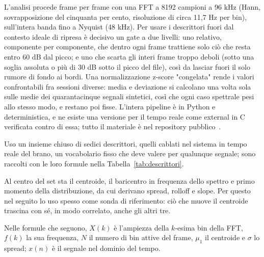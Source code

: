 \documentclass{article}
\begin{document}
L'analisi procede frame per frame con una FFT a 8192 campioni a 96 kHz (Hann, sovrapposizione del cinquanta per cento, risoluzione di circa 11,7 Hz per bin), sull'intera banda fino a Nyquist (48 kHz).%
 Per usare i descrittori fuori dal contesto ideale di ripresa è decisivo un gate a due livelli: uno relativo, componente per componente, che dentro ogni frame trattiene solo ciò che resta entro 60 dB dal picco; e uno che scarta gli interi frame troppo deboli (sotto una soglia assoluta o più di 30 dB sotto il picco del file), così da lasciar fuori il solo rumore di fondo ai bordi. Una normalizzazione z-score "congelata" rende i valori confrontabili fra sessioni diverse: media e deviazione si calcolano una volta sola sulle medie dei quarantacinque segnali sintetici, così che ogni caso spettrale pesi allo stesso modo, e restano poi fisse. L'intera pipeline è in Python e deterministica, e ne esiste una versione per il tempo reale come external in C verificata contro di essa; tutto il materiale è nel repository pubblico~\cite{reposupp}.

Uso un insieme chiuso di sedici descrittori, quelli cablati nel sistema in tempo reale del brano, un vocabolario fisso che deve valere per qualunque segnale; sono raccolti con le loro formule nella Tabella~\ref{tab:descrittori}.

Al centro del set sta il centroide, il baricentro in frequenza dello spettro e primo momento della distribuzione, da cui derivano spread, rolloff e slope. Per questo nel seguito lo uso spesso come sonda di riferimento: ciò che muove il centroide trascina con sé, in modo correlato, anche gli altri tre.

Nelle formule che seguono, $X(k)$ è l'ampiezza della $k$-esima bin della FFT, $f(k)$ la sua frequenza, $N$ il numero di bin attive del frame, $\mu_1$ il centroide e $\sigma$ lo spread; $x(n)$ è il segnale nel dominio del tempo.
\end{document}
